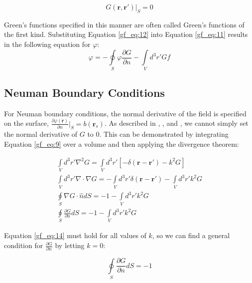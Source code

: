 \begin{equation}
G\left(\mathbf{r},\mathbf{r}' \right)\bigg|_{S}=0
\label{gf_eq:12}
\end{equation}
\renewcommand{\baselinestretch}{2} \small\normalsize

Green's functions specified in this manner are often called Green's functions of the first kind. Substituting Equation \ref{gf_eq:12} into Equation \ref{gf_eq:11} results in the following equation for $\varphi$:
\begin{equation}
\boxed{\varphi = -\oint\limits_{S} \varphi\frac{\partial G}{\partial n} -\int\limits_{V}d^3r' Gf}
\label{gf_eq:13}
\end{equation}
\renewcommand{\baselinestretch}{2} \small\normalsize

\subsection{Neuman Boundary Conditions}
For Neuman boundary conditions, the normal derivative of the field is specified on the surface, $\frac{\partial\varphi\left(\mathbf{r}\right)}{\partial n}|_{S} = b\left(\mathbf{r}_s\right)$. As described in \cite{jackson_classical_em}, \cite{zangwill_modern_em}, and \cite{balanis_advanced}, we cannot simply set the normal derivative of $G$ to $0$. This can be demonstrated by integrating Equation \ref{gf_eq:9} over a volume and then applying the divergence theorem:

\begin{equation}
\begin{gathered}
\int\limits_{V}d^3r' \nabla^2 G = \int\limits_{V}d^3r'\left[-\delta\left(\mathbf{r}-\mathbf{r}' \right) -k^2G \right] \\
\int\limits_{V}d^3r' \nabla \cdot \nabla G = -\int\limits_{V}d^3r'\delta\left(\mathbf{r}-\mathbf{r}' \right) -\int\limits_{V}d^3r'k^2G \\
\oint\limits_{S}\nabla G \cdot \hat{n} dS  = -1 - \int\limits_{V}d^3r'k^2G\\
\oint\limits_{S}\frac{\partial G}{\partial n} dS = -1 - \int\limits_{V}d^3r' k^2G
\end{gathered}
\label{gf_eq:14}
\end{equation}
\renewcommand{\baselinestretch}{2} \small\normalsize

Equation \ref{gf_eq:14} must hold for all values of $k$, so we can find a general condition for $\frac{\partial G}{\partial n}$ by letting $k = 0$:

\begin{equation}
\oint\limits_{S}\frac{\partial G}{\partial n} dS = -1
\label{gf_eq:15}
\end{equation}
\renewcommand{\baselinestretch}{2} \small\normalsize

